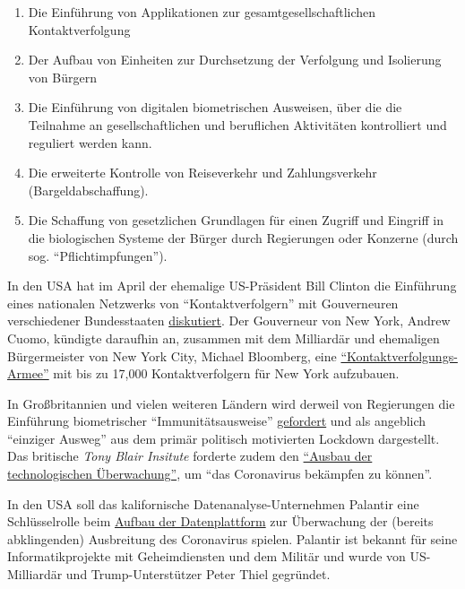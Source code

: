 \begin{enumerate}
\def\labelenumi{\arabic{enumi}.}
\tightlist
\item
  Die Einführung von Applikationen zur gesamtgesellschaftlichen
  Kontaktverfolgung
\item
  Der Aufbau von Einheiten zur Durchsetzung der Verfolgung und
  Isolierung von Bürgern
\item
  Die Einführung von digitalen biometrischen Ausweisen, über die die
  Teilnahme an gesellschaftlichen und beruflichen Aktivitäten
  kontrolliert und reguliert werden kann.
\item
  Die erweiterte Kontrolle von Reiseverkehr und Zahlungsverkehr
  (Bargeldabschaffung).
\item
  Die Schaffung von gesetzlichen Grundlagen für einen Zugriff und
  Eingriff in die biologischen Systeme der Bürger durch Regierungen oder
  Konzerne (durch sog. ``Pflichtimpfungen'').
\end{enumerate}

In den USA hat im April der ehemalige US-Präsident Bill Clinton die
Einführung eines nationalen Netzwerks von ``Kontaktverfolgern'' mit
Gouverneuren verschiedener Bundesstaaten
\href{https://www.youtube.com/watch?v=-Ug9XHT9JQQ}{diskutiert}. Der
Gouverneur von New York, Andrew Cuomo, kündigte daraufhin an, zusammen
mit dem Milliardär und ehemaligen Bürgermeister von New York City,
Michael Bloomberg, eine
\href{https://www.cbsnews.com/news/contact-tracing-new-york-cuomo-plan/}{``Kontaktverfolgungs-Armee''}
mit bis zu 17,000 Kontaktverfolgern für New York aufzubauen.

In Großbritannien und vielen weiteren Ländern wird derweil von
Regierungen die Einführung biometrischer ``Immunitätsausweise''
\href{https://www.msn.com/en-us/money/news/the-uk-just-published-blueprints-for-covid-19-immunity-passports-a-controversial-potential-route-out-of-lockdown/ar-BB13qr8L}{gefordert}
und als angeblich ``einziger Ausweg'' aus dem primär politisch
motivierten Lockdown dargestellt. Das britische \emph{Tony Blair
Insitute} forderte zudem den
\href{https://www.theguardian.com/world/2020/apr/24/surveillance-a-price-worth-paying-to-beat-coronavirus-says-blair-thinktank}{``Ausbau
der technologischen Überwachung''}, um ``das Coronavirus bekämpfen zu
können''.

In den USA soll das kalifornische Datenanalyse-Unternehmen Palantir eine
Schlüsselrolle beim
\href{https://www.msn.com/en-us/news/us/team-trump-turns-to-peter-thiel-s-palantir-to-track-virus/ar-BB130qfE}{Aufbau
der Datenplattform} zur Überwachung der (bereits abklingenden)
Ausbreitung des Coronavirus spielen. Palantir ist bekannt für seine
Informatikprojekte mit Geheimdiensten und dem Militär und wurde von
US-Milliardär und Trump-Unterstützer Peter Thiel gegründet.

